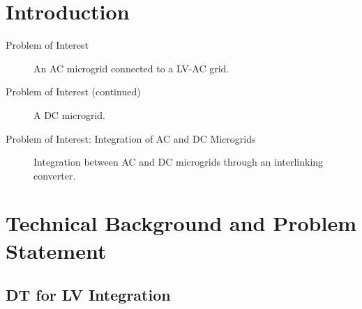 \section{Introduction}
\begin{frame}{Problem of Interest}
    \begin{figure}
        \centering
        \resizebox{!}{4cm}{}
        \caption{An AC microgrid connected to a LV-AC grid.}
    \end{figure}
\end{frame}

\begin{frame}{Problem of Interest (continued)}
    \begin{figure}
        \centering
        \resizebox{!}{4cm}{}
        \caption{A DC microgrid.}
    \end{figure}
\end{frame}

\begin{frame}{Problem of Interest: Integration of AC and DC Microgrids}
    \begin{figure}
        \centering
        \resizebox{!}{5.3cm}{}
        \caption{Integration between AC and DC microgrids through an interlinking converter.}
    \end{figure}
\end{frame}

\section{Technical Background and Problem Statement}
\subsection{DT for LV Integration}

